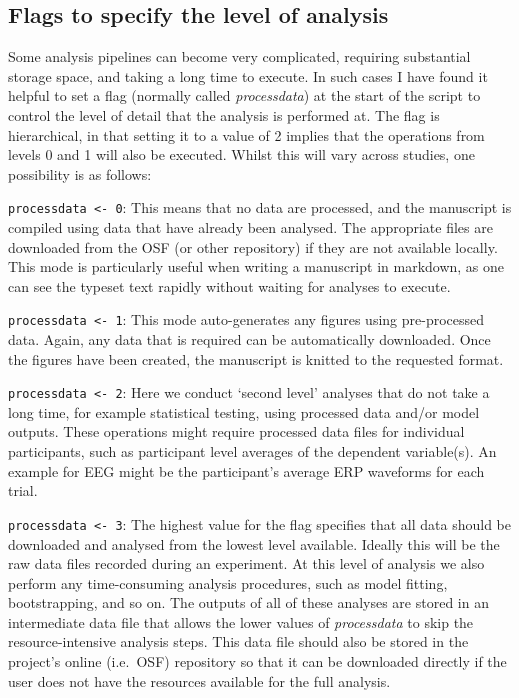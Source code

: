 \documentclass[
]{article}
\begin{document}
\hypertarget{flags-to-specify-the-level-of-analysis}{%
\subsection{Flags to specify the level of analysis}\label{flags-to-specify-the-level-of-analysis}}

Some analysis pipelines can become very complicated, requiring substantial storage space, and taking a long time to execute. In such cases I have found it helpful to set a flag (normally called \emph{processdata}) at the start of the script to control the level of detail that the analysis is performed at. The flag is hierarchical, in that setting it to a value of 2 implies that the operations from levels 0 and 1 will also be executed. Whilst this will vary across studies, one possibility is as follows:

\texttt{processdata\ \textless{}-\ 0}: This means that no data are processed, and the manuscript is compiled using data that have already been analysed. The appropriate files are downloaded from the OSF (or other repository) if they are not available locally. This mode is particularly useful when writing a manuscript in markdown, as one can see the typeset text rapidly without waiting for analyses to execute.

\texttt{processdata\ \textless{}-\ 1}: This mode auto-generates any figures using pre-processed data. Again, any data that is required can be automatically downloaded. Once the figures have been created, the manuscript is knitted to the requested format.

\texttt{processdata\ \textless{}-\ 2}: Here we conduct `second level' analyses that do not take a long time, for example statistical testing, using processed data and/or model outputs. These operations might require processed data files for individual participants, such as participant level averages of the dependent variable(s). An example for EEG might be the participant's average ERP waveforms for each trial.

\texttt{processdata\ \textless{}-\ 3}: The highest value for the flag specifies that all data should be downloaded and analysed from the lowest level available. Ideally this will be the raw data files recorded during an experiment. At this level of analysis we also perform any time-consuming analysis procedures, such as model fitting, bootstrapping, and so on. The outputs of all of these analyses are stored in an intermediate data file that allows the lower values of \emph{processdata} to skip the resource-intensive analysis steps. This data file should also be stored in the project's online (i.e.~OSF) repository so that it can be downloaded directly if the user does not have the resources available for the full analysis.
\end{document}
